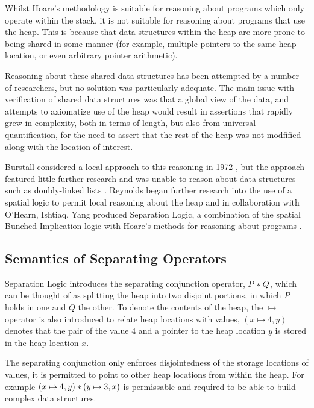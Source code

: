 \documentclass[a4paper]{report}
\begin{document}
  Whilst Hoare's methodology is suitable for reasoning about programs which only
  operate within the stack, it is not suitable for reasoning about programs that
  use the heap. This is because that data structures within the heap are more
  prone to being shared in some manner (for example, multiple pointers to the
  same heap location, or even arbitrary pointer arithmetic).
 
  Reasoning about these shared data structures has been attempted by a number of
  researchers, but no solution was particularly adequate. The main issue with
  verification of shared data structures was that a global view of the data, and
  attempts to axiomatize use of the heap would result in assertions
  that rapidly grew in complexity, both in terms of length, but also from
  universal quantification, for the need to assert that the rest of the heap was
  not modfified along with the location of interest.

  Burstall considered a local approach to this reasoning in 1972
  \cite{burstall1972some}, but the approach featured little further research and
  was unable to reason about data structures such as doubly-linked lists
  \cite{reynolds2000intuitionistic}. Reynolds began further research into the
  use of a spatial logic to permit local reasoning about the heap and in
  collaboration with O'Hearn, Ishtiaq, Yang produced Separation Logic, a
  combination of the spatial Bunched Implication logic with Hoare's methods for
  reasoning about programs
  \cite{Ishtiaq2001BI,OHearn2001Local,reynolds2000intuitionistic,Reynolds2002Separation}.

  \subsection{Semantics of Separating Operators}
  
  Separation Logic introduces the separating conjunction operator, $P \mathbin{*} Q$,
  which can be thought of as splitting the heap into two disjoint portions, in
  which $P$ holds in one and $Q$ the other. To denote the contents of the
  heap, the $\mapsto$ operator is also introduced to relate heap locations with
  values, $(x \mapsto 4, y)$ denotes that the pair of the value $4$ and a pointer
  to the heap location $y$ is stored in the heap location $x$.

  The separating conjunction only enforces disjointedness of the storage
  locations of values, it is permitted to point to other heap locations from
  within the heap. For example $(x \mapsto 4, y) \mathbin{*} (y \mapsto 3, x)$ is
  permissable and required to be able to build complex data structures.
\end{document}
